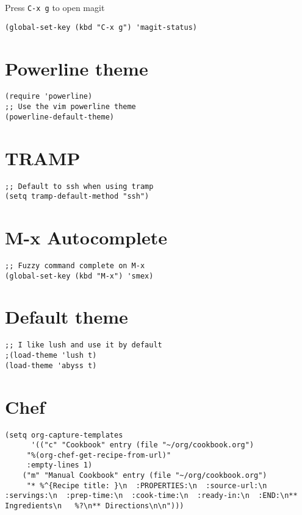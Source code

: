 \documentclass[11pt]{article}
\begin{document}
Press \texttt{C-x g} to open magit
\begin{verbatim}
(global-set-key (kbd "C-x g") 'magit-status)
\end{verbatim}
\section{Powerline theme}
\label{sec:org59b3fa2}
\begin{verbatim}
(require 'powerline)
;; Use the vim powerline theme
(powerline-default-theme)
\end{verbatim}
\section{TRAMP}
\label{sec:org92d674c}
\begin{verbatim}
;; Default to ssh when using tramp
(setq tramp-default-method "ssh")
\end{verbatim}
\section{M-x Autocomplete}
\label{sec:org603b8c1}
\begin{verbatim}
;; Fuzzy command complete on M-x
(global-set-key (kbd "M-x") 'smex)
\end{verbatim}
\section{Default theme}
\label{sec:org04c5551}
\begin{verbatim}
;; I like lush and use it by default
;(load-theme 'lush t)
(load-theme 'abyss t)
\end{verbatim}
\section{Chef}
\label{sec:org6fa2b1c}
\begin{verbatim}
(setq org-capture-templates
      '(("c" "Cookbook" entry (file "~/org/cookbook.org")
	 "%(org-chef-get-recipe-from-url)"
	 :empty-lines 1)
	("m" "Manual Cookbook" entry (file "~/org/cookbook.org")
	 "* %^{Recipe title: }\n  :PROPERTIES:\n  :source-url:\n  :servings:\n  :prep-time:\n  :cook-time:\n  :ready-in:\n  :END:\n** Ingredients\n   %?\n** Directions\n\n")))
\end{verbatim}
\end{document}
